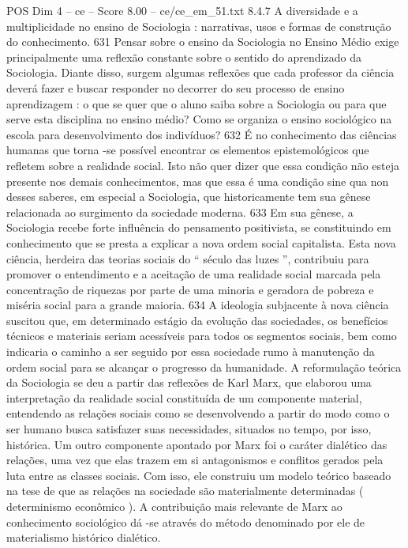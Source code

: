 \begin{textsample}{POS Dim 4 – ce – Score 8.00 – ce/ce\_em\_51.txt}  \label{ex:f4_pos_138}
8.4.7 A diversidade e a multiplicidade no ensino de Sociologia : narrativas, usos e formas de construção do conhecimento. 631 Pensar sobre o ensino da Sociologia no Ensino Médio exige principalmente uma reflexão constante sobre o sentido do aprendizado da Sociologia.
Diante disso, surgem algumas reflexões que cada professor da ciência deverá fazer e buscar responder no decorrer do seu processo de ensino aprendizagem : o que se quer que o aluno saiba sobre a Sociologia ou para que serve esta disciplina no ensino médio?
Como se organiza o ensino sociológico na escola para desenvolvimento dos indivíduos? 632 É no conhecimento das ciências humanas que torna -se possível encontrar os elementos epistemológicos que refletem sobre a realidade social.
Isto não quer dizer que essa condição não esteja presente nos demais conhecimentos, mas que essa é uma condição sine qua non desses saberes, em especial a Sociologia, que historicamente tem sua gênese relacionada ao surgimento da sociedade moderna. 633 Em sua gênese, a Sociologia recebe forte influência do pensamento positivista, se constituindo em conhecimento que se presta a explicar a nova ordem social capitalista.
Esta nova ciência, herdeira das teorias sociais do “ século das luzes ”, contribuiu para promover o entendimento e a aceitação de uma realidade social marcada pela concentração de riquezas por parte de uma minoria e geradora de pobreza e miséria social para a grande maioria. 634 A ideologia subjacente à nova ciência suscitou que, em determinado estágio da evolução das sociedades, os benefícios técnicos e materiais seriam acessíveis para todos os segmentos sociais, bem como indicaria o caminho a ser seguido por essa sociedade rumo à manutenção da ordem social para se alcançar o progresso da humanidade.
A reformulação teórica da Sociologia se deu a partir das reflexões de Karl Marx, que elaborou uma interpretação da realidade social constituída de um componente material, entendendo as relações sociais como se desenvolvendo a partir do modo como o ser humano busca satisfazer suas necessidades, situados no tempo, por isso, histórica.
Um outro componente apontado por Marx foi o caráter dialético das relações, uma vez que elas trazem em si antagonismos e conflitos gerados pela luta entre as classes sociais.
Com isso, ele construiu um modelo teórico baseado na tese de que as relações na sociedade são materialmente determinadas ( determinismo econômico ).
A contribuição mais relevante de Marx ao conhecimento sociológico dá -se através do método denominado por ele de materialismo histórico dialético.

\end{textsample}
